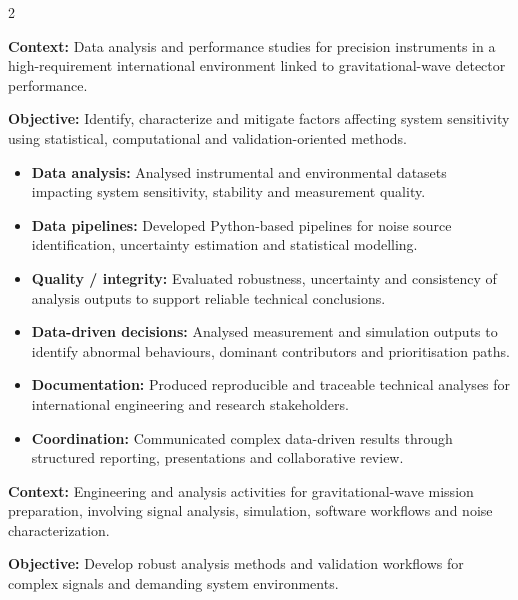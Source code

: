 \documentclass[8pt,a4paper,ragged2e,withhyper]{altacv}
\begin{document}
\begin{paracol}{2}
\divider


\textbf{Context:} Data analysis and performance studies for precision instruments in a high-requirement international environment linked to gravitational-wave detector performance.

\textbf{Objective:} Identify, characterize and mitigate factors affecting system sensitivity using statistical, computational and validation-oriented methods.

\begin{itemize}
  \item \textbf{Data analysis:} Analysed instrumental and environmental datasets impacting system sensitivity, stability and measurement quality.
  \item \textbf{Data pipelines:} Developed Python-based pipelines for noise source identification, uncertainty estimation and statistical modelling.
  \item \textbf{Quality / integrity:} Evaluated robustness, uncertainty and consistency of analysis outputs to support reliable technical conclusions.
  \item \textbf{Data-driven decisions:} Analysed measurement and simulation outputs to identify abnormal behaviours, dominant contributors and prioritisation paths.
  \item \textbf{Documentation:} Produced reproducible and traceable technical analyses for international engineering and research stakeholders.
  \item \textbf{Coordination:} Communicated complex data-driven results through structured reporting, presentations and collaborative review.
\end{itemize}

\divider


\textbf{Context:} Engineering and analysis activities for gravitational-wave mission preparation, involving signal analysis, simulation, software workflows and noise characterization.

\textbf{Objective:} Develop robust analysis methods and validation workflows for complex signals and demanding system environments.


\end{paracol}
\end{document}
